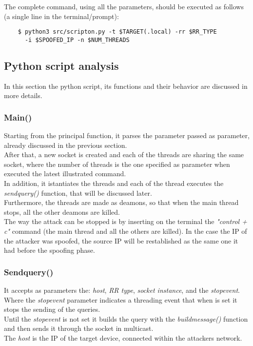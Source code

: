 \documentclass[fleqn, 10pt]{SelfArx} %
\begin{document}
The complete command, using all the parameters, should be executed as follows (a single line in the terminal/prompt):

\begin{scriptsize}
	\begin{verbatim}
	$ python3 src/scripton.py -t $TARGET(.local) -rr $RR_TYPE
	  -i $SPOOFED_IP -n $NUM_THREADS 
	\end{verbatim}
\end{scriptsize}

\subsection{Python script analysis}
In this section the python script, its functions and their behavior are discussed in more details.

\subsubsection{Main()}
Starting from the principal function, it parses the parameter passed as parameter, already discussed in the previous section.\\
After that, a new socket is created and each of the threads are sharing the same socket, where the
number of threads is the one specified as parameter when executed the latest illustrated command.\\
In addition, it istantiates the threads and each of the thread executes the {\it{send\textunderscore query()}} function, that will be
discussed later.\\
Furthermore, the threads are made as deamons, so that when the main thread stops, all the other deamons are
killed.\\
The way the attack can be stopped is by inserting on the terminal the {\it{"control + c"}} command (the main thread and all the others are killed).
In the case the IP of the attacker was spoofed, the source IP will be restablished as the same one it had before the spoofing phase.

\subsubsection{Send\textunderscore query()}
It accepts as parameters the: {\it{host}}, {\it{RR type}}, {\it{socket instance}}, and the {\it{stop\textunderscore event}}.
Where the {\it{stop\textunderscore event}} parameter indicates a threading event that when is set it stops the sending of the queries.\\
Until the {\it{stop\textunderscore event}} is not set it builds the query with the {\it{build\textunderscore message()}} function and then sends it through the socket 
in multicast.\\
The {\it{host}} is the IP of the target device, connected within the attackers network.
\end{document}
